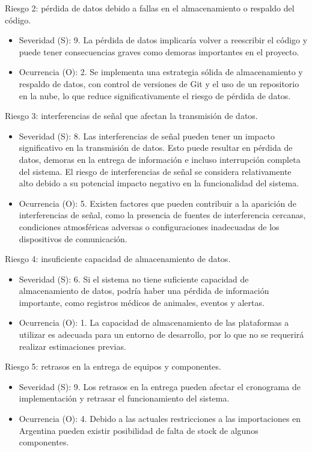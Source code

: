 \documentclass[
11pt, %
]{charter}
\begin{document}
Riesgo 2: pérdida de datos debido a fallas en el almacenamiento o respaldo del código.
\begin{itemize}
	\item Severidad (S): 9. La pérdida de datos implicaría volver a reescribir el código y puede tener consecuencias graves como demoras importantes en el proyecto.
	\item Ocurrencia (O): 2. Se implementa una estrategia sólida de almacenamiento y respaldo de datos, con control de versiones de Git y el uso de un repositorio en la nube, lo que reduce significativamente el riesgo de pérdida de datos. 
\end{itemize}

Riesgo 3: interferencias de señal que afectan la transmisión de datos.
\begin{itemize}
	\item Severidad (S): 8. Las interferencias de señal pueden tener un impacto significativo en la transmisión de datos. Esto puede resultar en pérdida de datos, demoras en la entrega de información e incluso interrupción completa del sistema. El riesgo de interferencias de señal se considera relativamente alto debido a su potencial impacto negativo en la funcionalidad del sistema.
	\item Ocurrencia (O): 5. Existen factores que pueden contribuir a la aparición de interferencias de señal, como la presencia de fuentes de interferencia cercanas, condiciones atmosféricas adversas o configuraciones inadecuadas de los dispositivos de comunicación.
\end{itemize}

Riesgo 4: insuficiente capacidad de almacenamiento de datos.
\begin{itemize}
	\item Severidad (S): 6. Si el sistema no tiene suficiente capacidad de almacenamiento de datos, podría haber una pérdida de información importante, como registros médicos de animales, eventos y alertas.
	\item Ocurrencia (O): 1. La capacidad de almacenamiento de las plataformas a utilizar es adecuada para un entorno de desarrollo, por lo que no se requerirá realizar estimaciones previas.
\end{itemize}

Riesgo 5: retrasos en la entrega de equipos y componentes.
\begin{itemize}
	\item Severidad (S): 9. Los retrasos en la entrega pueden afectar el cronograma de implementación y retrasar el funcionamiento del sistema.
	\item Ocurrencia (O): 4. Debido a las actuales restricciones a las importaciones en Argentina pueden existir posibilidad de falta de stock de algunos componentes.
\end{itemize}
\end{document}
